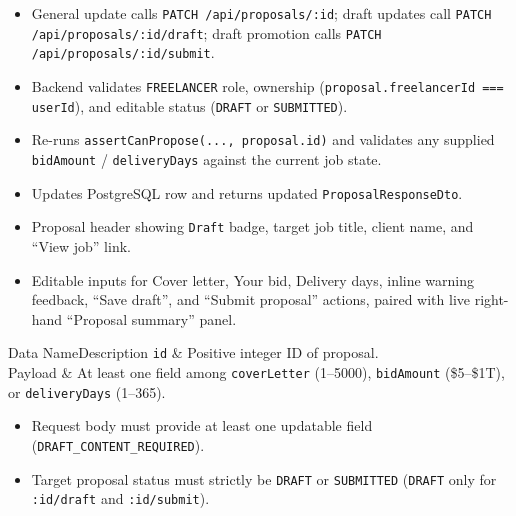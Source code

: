 \begin{itemize}[leftmargin=1.6em,topsep=3pt,itemsep=2pt,parsep=0pt,label=$\bullet$]
    \item General update calls \texttt{PATCH /\allowbreak{}api/\allowbreak{}proposals/\allowbreak{}:\allowbreak{}id}; draft updates call \texttt{PATCH /\allowbreak{}api/\allowbreak{}proposals/\allowbreak{}:\allowbreak{}id/\allowbreak{}draft}; draft promotion calls \texttt{PATCH /\allowbreak{}api/\allowbreak{}proposals/\allowbreak{}:\allowbreak{}id/\allowbreak{}submit}.
    \item Backend validates \texttt{FREELANCER} role, ownership (\texttt{proposal.freelancerId === userId}), and editable status (\texttt{DRAFT} or \texttt{SUBMITTED}).
    \item Re-runs \texttt{assertCanPropose(..., proposal.id)} and validates any supplied \texttt{bidAmount} / \texttt{deliveryDays} against the current job state.
    \item Updates PostgreSQL row and returns updated \texttt{ProposalResponseDto}.
\end{itemize}

\begin{itemize}[leftmargin=1.6em,topsep=3pt,itemsep=2pt,parsep=0pt,label=$\bullet$]
    \item Proposal header showing \texttt{Draft} badge, target job title, client name, and ``View job'' link.
    \item Editable inputs for Cover letter, Your bid, Delivery days, inline warning feedback, ``Save draft'', and ``Submit proposal'' actions, paired with live right-hand ``Proposal summary'' panel.
\end{itemize}


\begin{specdatatable}{Data Name}{Description}
\texttt{id} & Positive integer ID of proposal.\\ \hline
Payload & At least one field among \texttt{coverLetter} (1--5000), \texttt{bidAmount} (\$5--\$1T), or \texttt{deliveryDays} (1--365).\\ \hline
\end{specdatatable}

\begin{itemize}[leftmargin=1.6em,topsep=3pt,itemsep=2pt,parsep=0pt,label=$\bullet$]
    \item Request body must provide at least one updatable field (\texttt{DRAFT\_CONTENT\_REQUIRED}).
    \item Target proposal status must strictly be \texttt{DRAFT} or \texttt{SUBMITTED} (\texttt{DRAFT} only for \texttt{:id/draft} and \texttt{:id/submit}).
\end{itemize}

